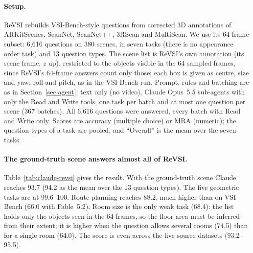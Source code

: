 \paragraph{Setup.}
ReVSI rebuilds VSI-Bench-style questions from corrected 3D annotations of ARKitScenes, ScanNet, ScanNet++, 3RScan
and MultiScan. We use its 64-frame subset: 6,616 questions on 380 scenes, in seven tasks (there is no appearance
order task) and 13 question types. The scene list is ReVSI's own annotation (its scene frame, $z$ up), restricted to
the objects visible in the 64 sampled frames, since ReVSI's 64-frame answers count only those; each box is given as
centre, size and yaw, roll and pitch, as in the VSI-Bench run. Prompt, rules and batching are as in
Section~\ref{sec:agent}: text only (no video), Claude Opus~5.5 sub-agents with only the Read and Write tools, one
task per batch and at most one question per scene (367 batches). All 6,616 questions were answered, every batch
with Read and Write only. Scores are accuracy (multiple choice) or MRA (numeric); the question types of a task are
pooled, and ``Overall'' is the mean over the seven tasks.

\paragraph{The ground-truth scene answers almost all of ReVSI.}
Table~\ref{tab:claude-revsi} gives the result. With the ground-truth scene Claude reaches 93.7 (94.2 as the mean over
the 13 question types). The five geometric tasks are at 99.6--100. Route planning reaches 88.2, much higher than
on VSI-Bench (66.0 with Fable~5.2). Room size is the only weak task (68.4): the list holds only the objects seen in
the 64 frames, so the floor area must be inferred from their extent; it is higher when the question allows several
rooms (74.5) than for a single room (64.0). The score is even across the five source datasets (93.2--95.5).

